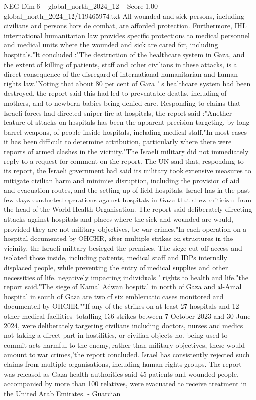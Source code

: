 \begin{textsample}{NEG Dim 6 – global\_north\_2024\_12 – Score 1.00 – global\_north\_2024\_12/119465974.txt}
All wounded and sick persons, including civilians and persons hors de combat, are afforded protection.
Furthermore, IHL international humanitarian law provides specific protections to medical personnel and medical units where the wounded and sick are cared for, including hospitals."It concluded :"The destruction of the healthcare system in Gaza, and the extent of killing of patients, staff and other civilians in these attacks, is a direct consequence of the disregard of international humanitarian and human rights law."Noting that about 80 per cent of Gaza ' s healthcare system had been destroyed, the report said this had led to preventable deaths, including of mothers, and to newborn babies being denied care.
Responding to claims that Israeli forces had directed sniper fire at hospitals, the report said :"Another feature of attacks on hospitals has been the apparent precision targeting, by long-barrel weapons, of people inside hospitals, including medical staff."In most cases it has been difficult to determine attribution, particularly where there were reports of armed clashes in the vicinity."The Israeli military did not immediately reply to a request for comment on the report.
The UN said that, responding to its report, the Israeli government had said its military took extensive measures to mitigate civilian harm and minimise disruption, including the provision of aid and evacuation routes, and the setting up of field hospitals.
Israel has in the past few days conducted operations against hospitals in Gaza that drew criticism from the head of the World Health Organisation.
The report said deliberately directing attacks against hospitals and places where the sick and wounded are would, provided they are not military objectives, be war crimes."In each operation on a hospital documented by OHCHR, after multiple strikes on structures in the vicinity, the Israeli military besieged the premises.
The siege cut off access and isolated those inside, including patients, medical staff and IDPs internally displaced people, while preventing the entry of medical supplies and other necessities of life, negatively impacting individuals ' rights to health and life,"the report said."The siege of Kamal Adwan hospital in north of Gaza and al-Amal hospital in south of Gaza are two of six emblematic cases monitored and documented by OHCHR.""If any of the strikes on at least 27 hospitals and 12 other medical facilities, totalling 136 strikes between 7 October 2023 and 30 June 2024, were deliberately targeting civilians including doctors, nurses and medics not taking a direct part in hostilities, or civilian objects not being used to commit acts harmful to the enemy, rather than military objectives, these would amount to war crimes,"the report concluded.
Israel has consistently rejected such claims from multiple organisations, including human rights groups.
The report was released as Gaza health authorities said 45 patients and wounded people, accompanied by more than 100 relatives, were evacuated to receive treatment in the United Arab Emirates. - Guardian

\end{textsample}

